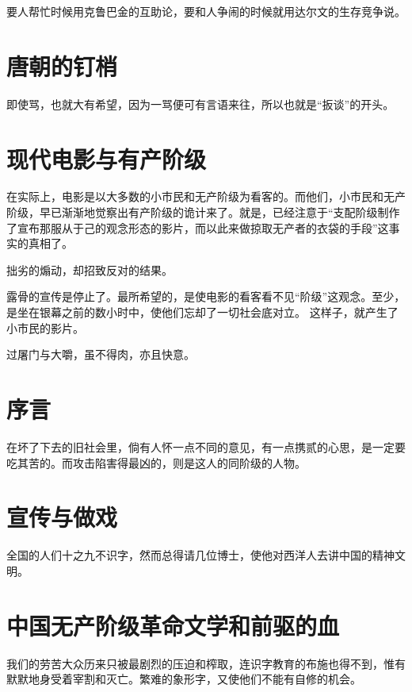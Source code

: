 \documentclass[a4paper]{article}
\begin{document}
\begin{sloppy}
        要人帮忙时候用克鲁巴金的互助论，要和人争闹的时候就用达尔文的生存竞争说。

        \section{
            唐朝的钉梢
        }
        即使骂，也就大有希望，因为一骂便可有言语来往，所以也就是“扳谈”的开头。

        \section{
            现代电影与有产阶级
        }
        在实际上，电影是以大多数的小市民和无产阶级为看客的。而他们，小市民和无产阶级，早已渐渐地觉察出有产阶级的诡计来了。就是，已经注意于“支配阶级制作了宣布那服从于己的观念形态的影片，而以此来做掠取无产者的衣袋的手段”这事实的真相了。

        拙劣的煽动，却招致反对的结果。

        露骨的宣传是停止了。最所希望的，是使电影的看客看不见“阶级”这观念。至少，是坐在银幕之前的数小时中，使他们忘却了一切社会底对立。
        这样子，就产生了小市民的影片。

        过屠门与大嚼，虽不得肉，亦且快意。

        \section{
            序言
        }
        在坏了下去的旧社会里，倘有人怀一点不同的意见，有一点携贰的心思，是一定要吃其苦的。而攻击陷害得最凶的，则是这人的同阶级的人物。

        \section{
            宣传与做戏
        }
        全国的人们十之九不识字，然而总得请几位博士，使他对西洋人去讲中国的精神文明。

        \section{
            中国无产阶级革命文学和前驱的血
        }
        我们的劳苦大众历来只被最剧烈的压迫和榨取，连识字教育的布施也得不到，惟有默默地身受着宰割和灭亡。繁难的象形字，又使他们不能有自修的机会。

    \end{sloppy}
\end{document}
